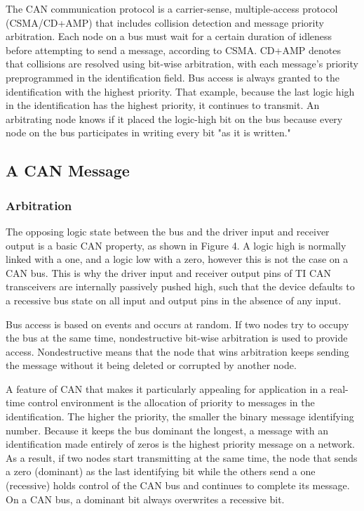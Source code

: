 The CAN communication protocol is a carrier-sense, multiple-access protocol (CSMA/CD+AMP) that includes collision detection and message priority arbitration. Each node on a bus must wait for a certain duration of idleness before attempting to send a message, according to CSMA. CD+AMP denotes that collisions are resolved using bit-wise arbitration, with each message's priority preprogrammed in the identification field. Bus access is always granted to the identification with the highest priority. That example, because the last logic high in the identification has the highest priority, it continues to transmit. An arbitrating node knows if it placed the logic-high bit on the bus because every node on the bus participates in writing every bit "as it is written."

\subsection{A CAN Message }
\subsubsection{Arbitration}

The opposing logic state between the bus and the driver input and receiver output is a basic CAN property, as shown in Figure 4. A logic high is normally linked with a one, and a logic low with a zero, however this is not the case on a CAN bus. This is why the driver input and receiver output pins of TI CAN transceivers are internally passively pushed high, such that the device defaults to a recessive bus state on all input and output pins in the absence of any input.

Bus access is based on events and occurs at random. If two nodes try to occupy the bus at the same time, nondestructive bit-wise arbitration is used to provide access. Nondestructive means that the node that wins arbitration keeps sending the message without it being deleted or corrupted by another node.

A feature of CAN that makes it particularly appealing for application in a real-time control environment is the allocation of priority to messages in the identification. The higher the priority, the smaller the binary message identifying number. Because it keeps the bus dominant the longest, a message with an identification made entirely of zeros is the highest priority message on a network. As a result, if two nodes start transmitting at the same time, the node that sends a zero (dominant) as the last identifying bit while the others send a one (recessive) holds control of the CAN bus and continues to complete its message. On a CAN bus, a dominant bit always overwrites a recessive bit.

